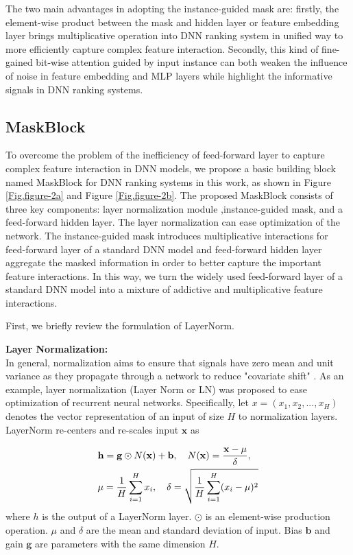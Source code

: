 \documentclass[sigconf]{acmart}
\begin{document}
The two main advantages in adopting the instance-guided mask are: firstly, the element-wise product between the mask and hidden layer or feature embedding layer brings multiplicative operation into DNN ranking system in unified way to more efficiently capture complex feature interaction. Secondly, this kind of fine-gained bit-wise attention guided by input instance can both weaken the influence of noise in feature embedding and MLP layers while highlight the informative signals in DNN ranking systems.






\subsection{MaskBlock}
To overcome the problem of the inefficiency of feed-forward layer to capture complex feature interaction in DNN models, we propose a basic building block named MaskBlock for DNN ranking systems in this work, as shown in Figure \ref{Fig.figure-2a} and Figure \ref{Fig.figure-2b}. The proposed MaskBlock  consists of three key components: layer normalization module ,instance-guided mask, and a feed-forward hidden layer. The layer normalization can ease optimization of the network. The instance-guided mask introduces multiplicative interactions for feed-forward layer of a standard DNN model and feed-forward hidden layer aggregate the masked information in order to better capture the important feature interactions. In this way, we turn the widely used feed-forward layer of a standard DNN model into a mixture of addictive and multiplicative feature interactions.

First, we briefly review the formulation of LayerNorm.

\noindent\textbf{Layer Normalization:}\\
\noindent In general, normalization aims to ensure that signals have zero mean and unit variance as they propagate through a network to reduce "covariate shift" \cite{ioffe2015batch}. As an example, layer normalization (Layer Norm or LN)\cite{ba2016layer} was proposed to ease optimization of recurrent neural networks. Specifically, let $x = (x_1, x_2, ..., x_H)$ denotes the vector representation of an input of size $H$ to normalization layers. LayerNorm re-centers and re-scales input $\mathbf{x}$ as

\begin{equation}
  \setlength\abovedisplayskip{0pt}
  \begin{split}
  &\mathbf{h} = \mathbf{g} \odot N(\mathbf{x}) + \mathbf{b}, \quad N(\mathbf{x}) = \frac{\mathbf{x}-\mu}{\delta}, \\
  & \mu = \frac{1}{H}\sum^H_{i=1}x_i, \quad \delta = \sqrt{\frac{1}{H}\sum^{H}_{i=1}(x_i - \mu)^2}
\end{split}
\end{equation}
where $h$ is the output of a LayerNorm layer. $\odot$ is an element-wise production operation. $\mu$ and $\delta$ are the mean and standard deviation of input. Bias $\mathbf{b}$ and gain $\mathbf{g}$ are parameters with the same dimension $H$.
\end{document}
